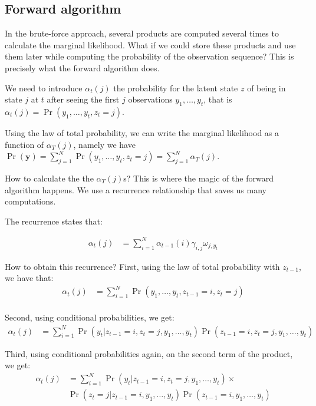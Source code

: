 \documentclass[
  12pt,
]{krantz}
\begin{document}
\hypertarget{forward-algorithm}{%
\subsection{Forward algorithm}\label{forward-algorithm}}

In the brute-force approach, several products are computed several times to calculate the marginal likelihood. What if we could store these products and use them later while computing the probability of the observation sequence? This is precisely what the forward algorithm does.

We need to introduce \(\alpha_t(j)\) the probability for the latent state \(z\) of being in state \(j\) at \(t\) after seeing the first \(j\) observations \(y_1, \ldots, y_t\), that is \(\alpha_t(j) = \Pr(y_1, \ldots, y_t, z_t = j)\).

Using the law of total probability, we can write the marginal likelihood as a function of \(\alpha_T(j)\), namely we have \(\Pr(\mathbf{y}) = \displaystyle{\sum_{j=1}^N\Pr(y_1, \ldots, y_t, z_t = j)} = \displaystyle{\sum_{j=1}^N\alpha_T(j)}\).

How to calculate the the \(\alpha_T(j)\)s? This is where the magic of the forward algorithm happens. We use a recurrence relationship that saves us many computations.

The recurrence states that:

\begin{align*}
\alpha_t(j) &= \sum_{i=1}^N \alpha_{t-1}(i) \gamma_{i,j} \omega_{j,y_t}
\end{align*}

How to obtain this recurrence? First, using the law of total probability with \(z_{t-1}\), we have that:
\begin{align*}
\alpha_t(j) &= \sum_{i=1}^N \Pr(y_1, \ldots, y_t, z_{t-1} = i, z_t = j)\\
\end{align*}

Second, using conditional probabilities, we get:
\begin{align*}
\alpha_t(j) &= \sum_{i=1}^N \Pr(y_t | z_{t-1} = i, z_t = j, y_1, \ldots, y_t) \Pr(z_{t-1} = i, z_t = j, y_1, \ldots, y_t)
\end{align*}

Third, using conditional probabilities again, on the second term of the product, we get:
\begin{align*}
\alpha_t(j) &= \sum_{i=1}^N \Pr(y_t | z_{t-1} = i, z_t = j, y_1, \ldots, y_t) \times \\ & \Pr(z_t = j | z_{t-1} = i, y_1, \ldots, y_t) \Pr(z_{t-1} = i, y_1, \ldots, y_t)
\end{align*}
\end{document}
